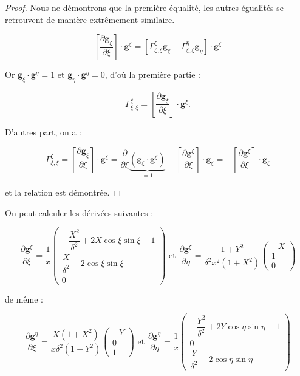 \begin{proof}
Nous ne démontrons que la première équalité, les autres égualités se retrouvent de manière extrêmement similaire.

$$\left[ \dfrac{\partial \mathbf{g}_{\xi}}{\partial \xi} \right] \cdot \mathbf{g}^{\xi} = \left[ \Gamma_{\xi,\xi}^{\xi} \mathbf{g}_{\xi} + \Gamma_{\xi,\xi}^{\eta} \mathbf{g}_{\eta} \right] \cdot \mathbf{g}^{\xi}$$

Or $\mathbf{g}_{\xi} \cdot \mathbf{g}^{\eta} = 1$ et $\mathbf{g}_{\eta} \cdot \mathbf{g}^{\eta} = 0$, d'où la première partie :

$$\Gamma_{\xi,\xi}^{\xi} = \left[ \dfrac{\partial \mathbf{g}_{\xi}}{\partial \xi} \right] \cdot \mathbf{g}^{\xi}.$$

D'autres part, on a :

$$\Gamma_{\xi,\xi}^{\xi} = \left[ \dfrac{\partial \mathbf{g}_{\xi}}{\partial \xi} \right] \cdot \mathbf{g}^{\xi} = \dfrac{\partial}{\partial \xi}  \underbrace{\left(\mathbf{g}_{\xi} \cdot \mathbf{g}^{\xi}\right)}_{=1}  - \left[ \dfrac{\partial \mathbf{g}^{\xi}}{\partial \xi}  \right] \cdot \mathbf{g}_{\xi} = - \left[ \dfrac{\partial \mathbf{g}^{\xi}}{\partial \xi}  \right] \cdot \mathbf{g}_{\xi}$$

et la relation est démontrée.
\end{proof}

On peut calculer les dérivées suivantes :

\begin{equation}
\dfrac{\partial \mathbf{g}^{\xi}}{\partial \xi} = \dfrac{1}{x} \begin{pmatrix}
-\dfrac{X^2}{\delta^2}+2X \cos \xi \sin \xi -1 \\ \dfrac{X}{\delta^2}-2 \cos \xi \sin \xi \\ 0
\end{pmatrix}
\text{ et }
\dfrac{\partial \mathbf{g}^{\xi}}{\partial \eta} = \dfrac{1+Y^2}{\delta^2 x^2 (1+X^2)} \begin{pmatrix}
-X \\ 1 \\ 0
\end{pmatrix}
\end{equation}

de même :

\begin{equation}
\dfrac{\partial \mathbf{g}^{\eta}}{\partial \xi} = \dfrac{X(1+X^2)}{x \delta^2 (1+Y^2)} \begin{pmatrix}
-Y \\ 0 \\ 1
\end{pmatrix}
\text{ et }
\dfrac{\partial \mathbf{g}^{\eta}}{\partial \eta} = \dfrac{1}{x} \begin{pmatrix}
- \dfrac{Y^2}{\delta^2} + 2 Y \cos \eta \sin \eta -1 \\ 0 \\ \dfrac{Y}{\delta^2}- 2 \cos \eta \sin \eta
\end{pmatrix}
\end{equation}

